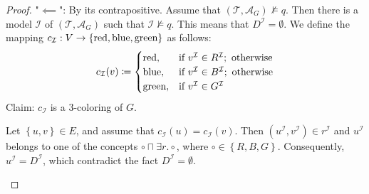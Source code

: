 \begin{proof}
	"$ \impliedby$": By its contrapositive.
	Assume that $(\mathcal{T}, \mathcal{A}_G) \not\vDash q$.
	Then there is a model $\mathcal{I}$ of $(\mathcal{T}, \mathcal{A}_G)$ such that $\mathcal{I} \not\vDash q$.
	This means that $D^{\mathcal{I}} = \emptyset$.
	We define the mapping $c_{\mathcal{I}}: V \to \left\{ \mathit{\text{red}}, \mathit{\text{blue}}, \mathit{\text{green}} \right\}$ as follows:
	\[
		c_{\mathcal{I}}(v) \coloneqq
		\begin{cases}
			\mathit{\text{red}},& \text{if } v^\mathcal{I} \in R^\mathcal{I}; \text{ otherwise} \\
			\mathit{\text{blue}},& \text{if } v^\mathcal{I} \in B^\mathcal{I}; \text{ otherwise} \\
			\mathit{\text{green}},& \text{if } v^\mathcal{I} \in G^\mathcal{I} \\
		\end{cases}
	\]
	Claim: $c_{\mathcal{I}}$ is a 3-coloring of $G$.
	\begin{subproof}
		Let $\left\{ u,v \right\} \in E$, and assume that $c_{\mathcal{I}}(u) = c_{\mathcal{I}}(v) $.
		Then $(u^{\mathcal{I}}, v^{\mathcal{I}}) \in r^{\mathcal{I}}$ and $u^{\mathcal{I}}$ belongs to one of the concepts
		$\circ \sqcap \exists r.\circ$, where $\circ \in \left\{ R, B, G \right\}$.
		Consequently, $u^{\mathcal{I}} = D^{\mathcal{I}}$, which contradict the fact $D^{\mathcal{I}} = \emptyset$. \contra
	\end{subproof}
\end{proof}
